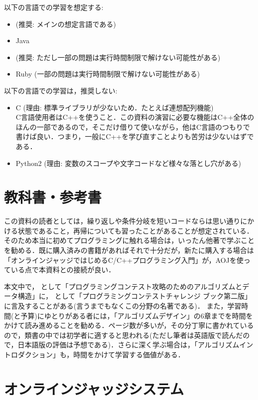以下の言語での学習を想定する:
\begin{itemize}
\item {} (推奨: メインの想定言語である)
\item Java 
\item {} (推奨: ただし一部の問題は実行時間制限で解けない可能性がある)
\item Ruby (一部の問題は実行時間制限で解けない可能性がある)
\end{itemize}

以下の言語での学習は，推奨しない:
\begin{itemize}
\item C (理由: 標準ライブラリが少ないため．たとえば連想配列機能)\\
  C言語使用者はC++を使うこと．この資料の演習に必要な機能はC++全体のほんの一部であるので，そこだけ借りて使いながら，他はC言語のつもりで書けば良い．つまり，一般にC++を学び直すことよりも苦労は少ないはずである．
\item Python2 (理由: 変数のスコープや文字コードなど様々な落とし穴がある)
\end{itemize}

\section{教科書・参考書}

この資料の読者としては，繰り返しや条件分岐を短いコードならは思い通りにかける状態であること，再帰についても習ったことがあることが想定されている．
そのため本当に初めてプログラミングに触れる場合は，いったん他著で学ぶことを勧める．既に購入済みの書籍があればそれで十分だが，新たに購入する場合は「オンラインジャッジではじめるC/C++プログラミング入門」\cite{book:aojcpp}が，AOJを使っている点で本資料との接続が良い．

本文中で，
\pcaojbook として「プログラミングコンテスト攻略のためのアルゴリズムとデータ構造」に，
\pccbook{}として「プログラミングコンテストチャレンジ
ブック第二版」に言及することがある(言うまでもなくこの分野の名著である)．
また，学習時間(と予算)にゆとりがある者には，「アルゴリズムデザイン」\cite{book:algorithmdesign}の6章までを時間をかけて読み進めることを勧める．ページ数が多いが，その分丁寧に書かれているので，類書の中では初学者に適すると思われる(ただし筆者は英語版で読んだので，日本語版の評価は予想である)．さらに深く学ぶ場合は，「アルゴリズムイントロダクション」\cite{book:algorithmintroduction}も，時間をかけて学習する価値がある．

\section{オンラインジャッジシステム}

